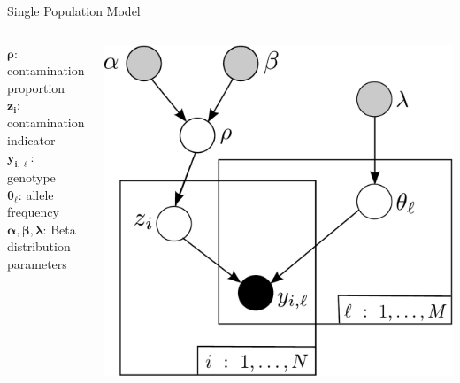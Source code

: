 \documentclass[letter,graphicx]{beamer}
\begin{document}
\begin{frame}{Single Population Model}
\begin{columns}[c]

\column{2.25in}
$\boldsymbol{\rho}$: contamination proportion \\
\vspace{3mm}
$\boldsymbol{z_i}$: contamination indicator \\
\vspace{3mm}
$\boldsymbol{y_{i,\ell}}$: genotype \\
\vspace{3mm}
$\boldsymbol{\theta_{\ell}}$: allele frequency \\
\vspace{3mm}
$\boldsymbol{\alpha}, \pmb{\beta}, \boldsymbol{\lambda}$: Beta distribution parameters

\column{2in}
\begin{center}
\includegraphics[width=1\textwidth]{images/DAG_1.pdf}
\end{center}
\end{columns}
\end{frame}
\end{document}
